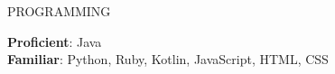 \documentclass{resume} %
\begin{document}

\begin{rSection}{PROGRAMMING}
	
\textbf{Proficient}: Java \\
\textbf{Familiar}: Python, Ruby, Kotlin, JavaScript, HTML, CSS       \\
	
\end{rSection}












\end{document}
